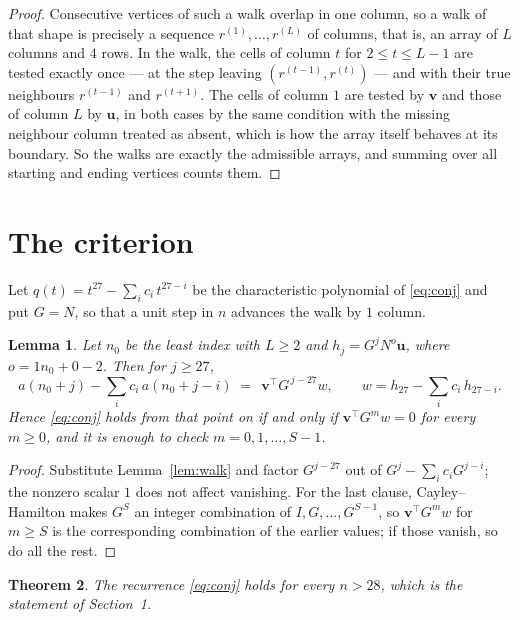 \documentclass[11pt,a4paper]{article}
\theoremstyle{plain}
\newtheorem{theorem}{Theorem}
\newtheorem{lemma}[theorem]{Lemma}
\theoremstyle{definition}
\begin{document}
\begin{proof}
Consecutive vertices of such a walk overlap in one column, so a walk of that shape is
precisely a sequence $r^{(1)},\dots,r^{(L)}$ of columns, that is, an array of $L$ columns
and $4$ rows. In the walk, the cells of column $t$ for $2\le t\le L-1$ are tested
exactly once --- at the step leaving $(r^{(t-1)},r^{(t)})$ --- and with their true
neighbours $r^{(t-1)}$ and $r^{(t+1)}$. The cells of column $1$ are tested by
$\mathbf{v}$ and those of column $L$ by $\mathbf{u}$, in both cases by the same condition
with the missing neighbour column treated as absent, which is how the array itself behaves at
its boundary. So the walks are exactly the admissible arrays, and summing over all starting
and ending vertices counts them.
\end{proof}

\section{The criterion}

Let $q(t)=t^{27}-\sum_i c_i\,t^{27-i}$ be the characteristic polynomial of
\eqref{eq:conj} and put $G=N$, so that a unit step in $n$ advances the walk by
$1$ column.

\begin{lemma}\label{lem:crit}
Let $n_0$ be the least index with $L\ge2$ and $h_j=G^{j}N^{o}\mathbf{u}$, where
$o=1n_0+0-2$. Then for $j\ge27$,
\[
a(n_0+j)-\sum_i c_i\,a(n_0+j-i)\;=\;\,\mathbf{v}^{\!\top}G^{\,j-27}w,
\qquad w=h_{27}-\sum_i c_i\,h_{27-i} .
\]
Hence \eqref{eq:conj} holds from that point on if and only if
$\mathbf{v}^{\!\top}G^{m}w=0$ for every $m\ge0$, and it is enough to check
$m=0,1,\dots,S-1$.
\end{lemma}

\begin{proof}
Substitute Lemma~\ref{lem:walk} and factor $G^{j-27}$ out of
$G^{j}-\sum_ic_iG^{j-i}$; the nonzero scalar $1$ does not affect
vanishing. For the last clause, Cayley--Hamilton makes $G^{S}$ an integer combination of
$I,G,\dots,G^{S-1}$, so $\mathbf{v}^{\!\top}G^{m}w$ for $m\ge S$ is the corresponding
combination of the earlier values; if those vanish, so do all the rest.
\end{proof}

\begin{theorem}
The recurrence \eqref{eq:conj} holds for every $n>28$, which is the statement of
Section~1.
\end{theorem}
\end{document}

